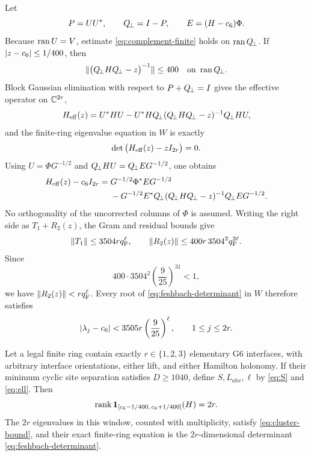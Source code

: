Let
\begin{equation}
 P=UU^*,\qquad Q_{\!\perp}=I-P,\qquad E=(H-c_6)\Phi.
 \label{eq:PE}
\end{equation}
Because \(\operatorname{ran} U=V\), estimate \eqref{eq:complement-finite} holds on
\(\operatorname{ran}Q_{\!\perp}\).  If \(|z-c_6|\leq1/400\), then
\begin{equation}
 \|\big(Q_{\!\perp} HQ_{\!\perp}-z\big)^{-1}\|\leq400
 \quad\text{on }\operatorname{ran}Q_{\!\perp}.
 \label{eq:resolvent}
\end{equation}
Block Gaussian elimination with respect to \(P+Q_{\!\perp}=I\) gives the
effective operator on \(\mathbb C^{2r}\),
\begin{equation}
 H_{\mathrm{eff}}(z)=U^*HU-U^*HQ_{\!\perp}
 (Q_{\!\perp} HQ_{\!\perp}-z)^{-1}Q_{\!\perp} HU,
 \label{eq:feshbach}
\end{equation}
and the finite-ring eigenvalue equation in \(W\) is exactly
\begin{equation}
 \det\big(H_{\mathrm{eff}}(z)-zI_{2r}\big)=0.
 \label{eq:feshbach-determinant}
\end{equation}
Using \(U=\Phi G^{-1/2}\) and
\(Q_{\!\perp} HU=Q_{\!\perp} EG^{-1/2}\), one obtains
\begin{align}
 H_{\mathrm{eff}}(z)-c_6I_{2r}
={}&G^{-1/2}\Phi^*EG^{-1/2} \notag\\
 &-G^{-1/2}E^*Q_{\!\perp}(Q_{\!\perp} HQ_{\!\perp}-z)^{-1}
 Q_{\!\perp} EG^{-1/2}.
 \label{eq:feshbach-expanded}
\end{align}
No orthogonality of the uncorrected columns of \(\Phi\) is assumed.
Writing the right side as \(T_1+R_2(z)\), the Gram and residual bounds give
\begin{equation}
 \|T_1\|\leq3504rq_{\mathrm F}^\ell,\qquad
 \|R_2(z)\|\leq400r\,3504^2q_{\mathrm F}^{2\ell}.
 \label{eq:feshbach-bounds}
\end{equation}
Since
\begin{equation}
 400\cdot3504^2\left(\frac9{25}\right)^{31}<1,
 \label{eq:remainder-numeric}
\end{equation}
we have \(\|R_2(z)\|<rq_{\mathrm F}^\ell\).  Every root of
\eqref{eq:feshbach-determinant} in \(W\) therefore satisfies
\begin{equation}
 |\lambda_j-c_6|<3505r\left(\frac9{25}\right)^\ell,
 \qquad 1\leq j\leq2r.
 \label{eq:cluster-bound}
\end{equation}

\begin{theorem}
\label{thm:exact-2r}
Let a legal finite ring contain exactly \(r\in\{1,2,3\}\) elementary G6
interfaces, with arbitrary interface orientations, either lift, and either
Hamilton holonomy.  If their minimum cyclic site separation satisfies
\(D\geq1040\), define \(S,L_{\mathrm{site}},\ell\) by
\eqref{eq:S} and \eqref{eq:ell}.  Then
\[
 \operatorname{rank}\mathbf 1_{[c_6-1/400,\,c_6+1/400]}(H)=2r.
\]
The \(2r\) eigenvalues in this window, counted with multiplicity, satisfy
\eqref{eq:cluster-bound}, and their exact finite-ring equation is the
\(2r\)-dimensional determinant \eqref{eq:feshbach-determinant}.
\end{theorem}

